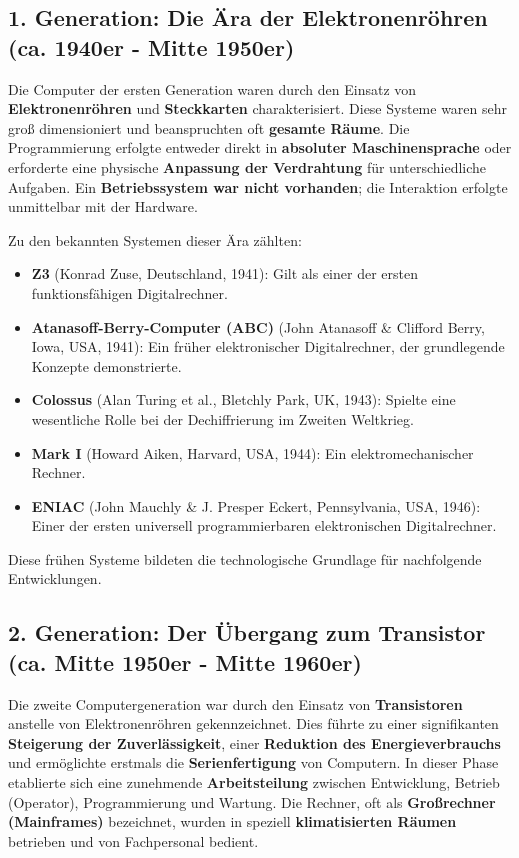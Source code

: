 \subsection{1. Generation: Die Ära der Elektronenröhren (ca. 1940er - Mitte 1950er)}

Die Computer der ersten Generation waren durch den Einsatz von \textbf{Elektronenröhren} und \textbf{Steckkarten} charakterisiert. Diese Systeme waren sehr groß dimensioniert und beanspruchten oft \textbf{gesamte Räume}. Die Programmierung erfolgte entweder direkt in \textbf{absoluter Maschinensprache} oder erforderte eine physische \textbf{Anpassung der Verdrahtung} für unterschiedliche Aufgaben. Ein \textbf{Betriebssystem war nicht vorhanden}; die Interaktion erfolgte unmittelbar mit der Hardware.

Zu den bekannten Systemen dieser Ära zählten:
\begin{itemize}
    \item \textbf{Z3} (Konrad Zuse, Deutschland, 1941): Gilt als einer der ersten funktionsfähigen Digitalrechner.
    \item \textbf{Atanasoff-Berry-Computer (ABC)} (John Atanasoff \& Clifford Berry, Iowa, USA, 1941): Ein früher elektronischer Digitalrechner, der grundlegende Konzepte demonstrierte.
    \item \textbf{Colossus} (Alan Turing et al., Bletchly Park, UK, 1943): Spielte eine wesentliche Rolle bei der Dechiffrierung im Zweiten Weltkrieg.
    \item \textbf{Mark I} (Howard Aiken, Harvard, USA, 1944): Ein elektromechanischer Rechner.
    \item \textbf{ENIAC} (John Mauchly \& J. Presper Eckert, Pennsylvania, USA, 1946): Einer der ersten universell programmierbaren elektronischen Digitalrechner.
\end{itemize}
Diese frühen Systeme bildeten die technologische Grundlage für nachfolgende Entwicklungen.

\subsection{2. Generation: Der Übergang zum Transistor (ca. Mitte 1950er - Mitte 1960er)}

Die zweite Computergeneration war durch den Einsatz von \textbf{Transistoren} anstelle von Elektronenröhren gekennzeichnet. Dies führte zu einer signifikanten \textbf{Steigerung der Zuverlässigkeit}, einer \textbf{Reduktion des Energieverbrauchs} und ermöglichte erstmals die \textbf{Serienfertigung} von Computern. In dieser Phase etablierte sich eine zunehmende \textbf{Arbeitsteilung} zwischen Entwicklung, Betrieb (Operator), Programmierung und Wartung. Die Rechner, oft als \textbf{Großrechner (Mainframes)} bezeichnet, wurden in speziell \textbf{klimatisierten Räumen} betrieben und von Fachpersonal bedient.

